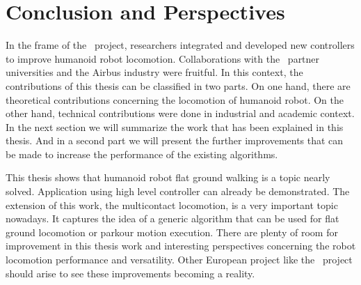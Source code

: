 \documentclass[a4paper,11pt,twoside]{StyleThese}
\begin{document}
\fi


\chapter*{Conclusion and Perspectives}
\setcounter{secnumdepth}{-1}

\cleardoublepage

In the frame of the \koroibot\ project, researchers integrated and developed new controllers to improve humanoid robot locomotion.
Collaborations with the \koroibot\ partner universities and the Airbus industry were fruitful.
In this context, the contributions of this thesis can be classified in two parts.
On one hand, there are theoretical contributions concerning the locomotion of humanoid robot.
On the other hand, technical contributions were done in industrial and academic context.
In the next section we will summarize the work that has been explained in this thesis.
And in a second part we will present the further improvements that can be made to increase the performance of the existing algorithms.




This thesis shows that humanoid robot flat ground walking is a topic nearly solved.
Application using high level controller can already be demonstrated.
The extension of this work, the multicontact locomotion, is a very important topic nowadays.
It captures the idea of a generic algorithm that can be used for flat ground locomotion or parkour motion execution.
There are plenty of room for improvement in this thesis work and interesting perspectives concerning the robot locomotion performance and versatility.
Other European project like the \koroibot\ project should arise to see these improvements becoming a reality.

\setcounter{secnumdepth}{+3}

\ifdefined{}
\else
{


\restoregeometry
}
\end{document}
